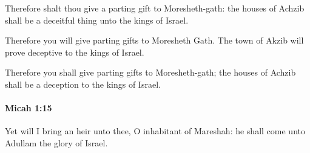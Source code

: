 			\begin{versebox}
					\item[BHS] 
					\item[LXX] 
					\item[ASV] Therefore shalt thou give a parting gift to Moresheth-gath: the houses of Achzib shall be a deceitful thing unto the kings of Israel.
					\item[NIV] Therefore you will give parting gifts to Moresheth Gath. The town of Akzib will prove deceptive to the kings of Israel.
					\item[NRSV] Therefore you shall give parting gifts to Moresheth-gath; the houses of Achzib shall be a deception to the kings of Israel.
			\end{versebox}

		\paragraph{Micah 1:15} %
			\label{MICAH-1-15}

			Yet will I bring an heir unto thee, O inhabitant of Mareshah: he shall come unto Adullam the glory of Israel.

